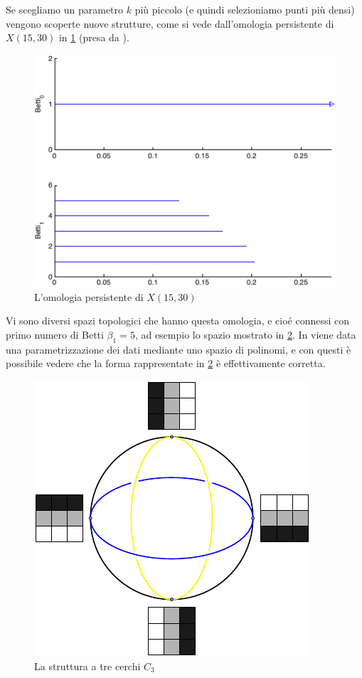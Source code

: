 Se scegliamo un parametro $k$ più piccolo (e quindi selezioniamo punti più densi) vengono scoperte nuove strutture, come si vede dall'omologia persistente di $X(15,30)$ in \cref{fig:k15persistence} (presa da \cite{Carlsson2008}).

\begin{figure}[ht]
  \begin{center}
    \includegraphics[width=.8\linewidth]{gfx/image_patches_k15.pdf}
    \caption{L'omologia persistente di $X(15,30)$}
    \label{fig:k15persistence}
  \end{center}
\end{figure}

Vi sono diversi spazi topologici che hanno questa omologia, e cioé connessi con primo numero di Betti $\beta_1=5$, ad esempio lo spazio mostrato in \cref{fig:patchshape}. In \cite{Carlsson2008} viene data una parametrizzazione dei dati mediante uno spazio di polinomi, e con questi è possibile vedere che la forma rappresentate in \cref{fig:patchshape} è effettivamente corretta.

\begin{figure}[ht]
  \begin{center}
    \includegraphics[width=.4\linewidth]{gfx/patches_shape_labels.pdf}
    \caption{La struttura a tre cerchi $C_3$}
    \label{fig:patchshape}
  \end{center}
\end{figure}

